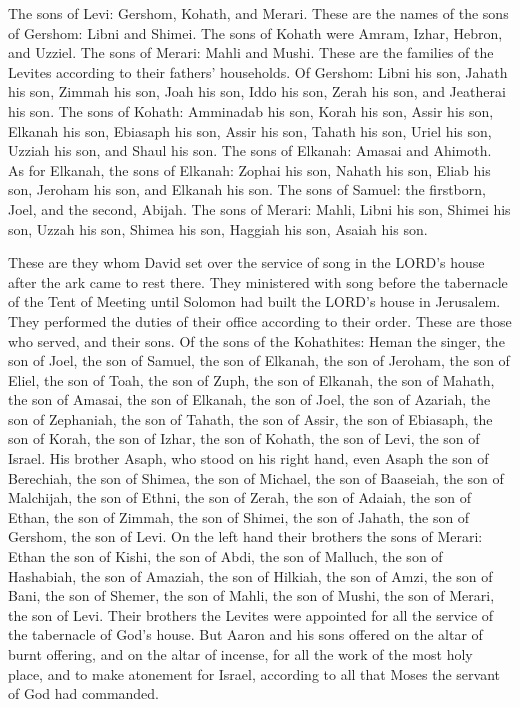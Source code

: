  The sons of Levi: Gershom, Kohath, and Merari.
 These are the names of the sons of Gershom: Libni and
Shimei.  The sons of Kohath were Amram, Izhar, Hebron,
and Uzziel.  The sons of Merari: Mahli and Mushi. These
are the families of the Levites according to their fathers' households.
 Of Gershom: Libni his son, Jahath his son, Zimmah his
son,  Joah his son, Iddo his son, Zerah his son, and
Jeatherai his son.  The sons of Kohath: Amminadab his
son, Korah his son, Assir his son,  Elkanah his son,
Ebiasaph his son, Assir his son,  Tahath his son, Uriel
his son, Uzziah his son, and Shaul his son.  The sons of
Elkanah: Amasai and Ahimoth.  As for Elkanah, the sons of
Elkanah: Zophai his son, Nahath his son,  Eliab his son,
Jeroham his son, and Elkanah his son.  The sons of
Samuel: the firstborn, Joel, and the second, Abijah.  The
sons of Merari: Mahli, Libni his son, Shimei his son, Uzzah his son,
 Shimea his son, Haggiah his son, Asaiah his son.

 These are they whom David set over the service of song
in the LORD's house after the ark came to rest there. 
They ministered with song before the tabernacle of the Tent of Meeting
until Solomon had built the LORD's house in Jerusalem. They performed
the duties of their office according to their order. 
These are those who served, and their sons. Of the sons of the
Kohathites: Heman the singer, the son of Joel, the son of Samuel,
 the son of Elkanah, the son of Jeroham, the son of
Eliel, the son of Toah,  the son of Zuph, the son of
Elkanah, the son of Mahath, the son of Amasai,  the son
of Elkanah, the son of Joel, the son of Azariah, the son of Zephaniah,
 the son of Tahath, the son of Assir, the son of
Ebiasaph, the son of Korah,  the son of Izhar, the son of
Kohath, the son of Levi, the son of Israel.  His brother
Asaph, who stood on his right hand, even Asaph the son of Berechiah, the
son of Shimea,  the son of Michael, the son of Baaseiah,
the son of Malchijah,  the son of Ethni, the son of
Zerah, the son of Adaiah,  the son of Ethan, the son of
Zimmah, the son of Shimei,  the son of Jahath, the son of
Gershom, the son of Levi.  On the left hand their
brothers the sons of Merari: Ethan the son of Kishi, the son of Abdi,
the son of Malluch,  the son of Hashabiah, the son of
Amaziah, the son of Hilkiah,  the son of Amzi, the son of
Bani, the son of Shemer,  the son of Mahli, the son of
Mushi, the son of Merari, the son of Levi.  Their
brothers the Levites were appointed for all the service of the
tabernacle of God's house.  But Aaron and his sons
offered on the altar of burnt offering, and on the altar of incense, for
all the work of the most holy place, and to make atonement for Israel,
according to all that Moses the servant of God had commanded.


